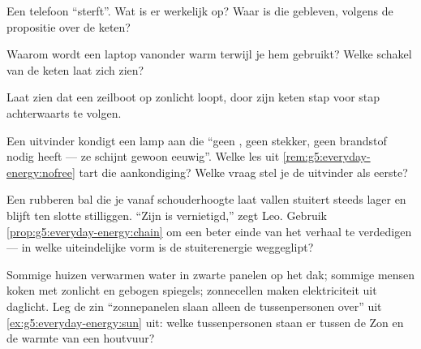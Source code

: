 \begin{exercise}[$\star$]\label{exo:g5:everyday-energy:6}
Een telefoon ``sterft''. Wat is er werkelijk op? Waar is die
 gebleven, volgens de propositie over de keten?
\end{exercise}

\begin{exercise}[$\star$]\label{exo:g5:everyday-energy:7}
Waarom wordt een laptop vanonder warm terwijl je hem gebruikt? Welke
schakel van de keten laat zich zien?
\end{exercise}

\begin{exercise}[$\star$]\label{exo:g5:everyday-energy:8}
Laat zien dat een zeilboot op zonlicht loopt, door zijn keten stap
voor stap achterwaarts te volgen.
\end{exercise}

\begin{exercise}[$\star\star$]\label{exo:g5:everyday-energy:9}
Een uitvinder kondigt een lamp aan die ``geen , geen
stekker, geen brandstof nodig heeft --- ze schijnt gewoon eeuwig''.
Welke les uit \cref{rem:g5:everyday-energy:nofree} tart die
aankondiging? Welke vraag stel je de uitvinder als eerste?
\end{exercise}

\begin{exercise}[$\star\star$]\label{exo:g5:everyday-energy:10}
Een rubberen bal die je vanaf schouderhoogte laat vallen stuitert
steeds lager en blijft ten slotte stilliggen. ``Zijn  is
vernietigd,'' zegt Leo. Gebruik \cref{prop:g5:everyday-energy:chain}
om een beter einde van het verhaal te verdedigen --- in welke
uiteindelijke vorm is de stuiterenergie weggeglipt?
\end{exercise}

\begin{exercise}[$\star\star$]\label{exo:g5:everyday-energy:11}
Sommige huizen verwarmen water in zwarte panelen op het dak; sommige
mensen koken met zonlicht en gebogen spiegels; zonnecellen maken
elektriciteit uit daglicht. Leg de zin ``zonnepanelen slaan alleen de
tussenpersonen over'' uit \cref{ex:g5:everyday-energy:sun} uit: welke
tussenpersonen staan er tussen de Zon en de warmte van een houtvuur?
\end{exercise}

